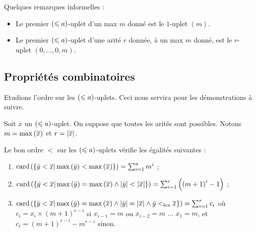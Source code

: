 		\begin{remark}
			Quelques remarques informelles : 
			\begin{itemize}
				\item 	Le premier $\left( \leqslant a \right)$-uplet d'un max $m$ donné est le $1$-uplet $\left( m \right)$.
				\item 	Le premier $\left( \leqslant a \right)$-uplet d'une arité $r$ donnée, à un max $m$ donné, est le $r$-uplet $\left( 0, \dots, 0, m\right)$.
			\end{itemize}
		\end{remark}
		
		
		
		\subsection{Propriétés combinatoires}
		\label{subsec:bon_ordre_prop_combinatoires}
		
		Etudions l'ordre sur les $\left( \leqslant a \right)$-uplets. Ceci nous servira pour les démonstrations à suivre. 
		
		\begin{prop}
			\label{prop:bon_ordre_combinatoire}
			Soit $\overline{x}$ un $\left( \leqslant a \right)$-uplet. On suppose que toutes les arités sont possibles. Notons $m = \max\left( \overline{x} \right)$ et $r = \left|\overline{x}\right|$.
			
			Le bon ordre $<$ sur les $\left( \leqslant a \right)$-uplets vérifie les égalités suivantes :
			
			\begin{enumerate}
				\item 	\label{itm:bon_ordre_combinatoire1} 
						$\text{card}\left( \left\lbrace \bar{y} < \overline{x} | \max\left( \bar{y} \right) < \max\left( \overline{x} \right) \right\rbrace \right) = \sum_{i=1}^{a} m^i$ ;
						
				\item 	\label{itm:bon_ordre_combinatoire2} 
						$\text{card}\left( \left\lbrace \bar{y} < \overline{x} | \max\left( \bar{y} \right) = \max\left( \overline{x} \right) \wedge \left|\bar{y}\right| < \left|\overline{x}\right|  \right\rbrace \right) = \sum_{i=1}^{r} \left( \left(m+1\right)^i -1 \right)$ ; 
						
				\item 	\label{itm:bon_ordre_combinatoire3} 
						$\text{card}\left( \left\lbrace \bar{y} < \overline{x} | \max\left( \bar{y} \right) = \max\left( \overline{x} \right) \wedge \left|\bar{y}\right| = \left|\overline{x}\right| \wedge \bar{y} <_{\text{lex}} \overline{x}  \right\rbrace \right) = \sum_{i=1}^{r} c_i$ où $c_i = x_i \times \left(m+1\right)^{r-i}$ si $x_{i-1} = m$ ou $x_{i-2} = m$ $\dots$ $x_{1} = m$, et $c_i = \left(m+1\right)^{r-i}-m^{r-i}$ sinon. 
			\end{enumerate}
		\end{prop}
		
